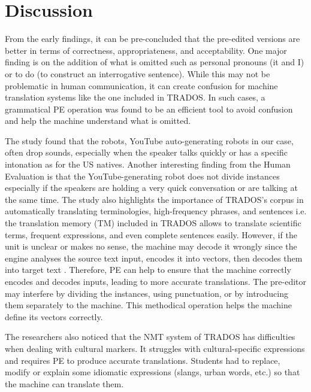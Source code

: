 \documentclass[english]{textolivre}
\begin{document}
\section{Discussion}

From the early findings, it can be pre-concluded that the pre-edited versions are better in terms of correctness, appropriateness, and acceptability. One major finding is on the addition of what is omitted such as personal pronouns (it and I) or to do (to construct an interrogative sentence). While this may not be problematic in human communication, it can create confusion for machine translation systems like the one included in TRADOS. In such cases, a grammatical PE operation was found to be an efficient tool to avoid confusion and help the machine understand what is omitted.

The study found that the robots, YouTube auto-generating robots in our case, often drop sounds, especially when the speaker talks quickly or has a specific intonation as for the US natives. Another interesting finding from the Human Evaluation is that the YouTube-generating robot does not divide instances especially if the speakers are holding a very quick conversation or are talking at the same time. The study also highlights the importance of TRADOS’s corpus in automatically translating terminologies, high-frequency phrases, and sentences \cite[p. 255-256]{wang_translation_2016} i.e. the translation memory (TM) included in TRADOS allows to translate scientific terms, frequent expressions, and even complete sentences easily. However, if the unit is unclear or makes no sense, the machine may decode it wrongly since the engine analyses the source text input, encodes it into vectors, then decodes them into target text \cite{rivera-trigueros_machine_2022}. Therefore, PE can help to ensure that the machine correctly encodes and decodes inputs, leading to more accurate translations. The pre-editor may interfere by dividing the instances, using punctuation, or by introducing them separately to the machine. This methodical operation helps the machine define its vectors correctly.

The researchers also noticed that the NMT system of TRADOS has difficulties when dealing with cultural markers. It struggles with cultural-specific expressions and requires PE to produce accurate translations. Students had to replace, modify or explain some idiomatic expressions (slangs, urban words, etc.) so that the machine can translate them.
\end{document}
